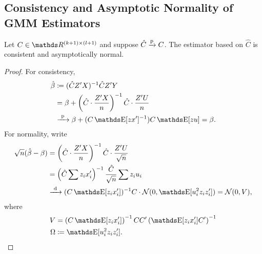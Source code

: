 \documentclass[letterpaper, 10pt]{article}
\begin{document}
\subsection{Consistency and Asymptotic Normality of GMM Estimators}
\begin{proposition}
  Let \(C \in \RR^{(k + 1) \times (l + 1)}\) and suppose \(\hat{C} \xrightarrow{\mathrm{p}} C\).
  The estimator based on \(\hat{C}\) is consistent and asymptotically normal.
\end{proposition}
\begin{proof}
  For consistency,
  \begin{align*}
    \hat{\beta}
    &\coloneqq (\hat{C} Z' X)^{-1} \hat{C} Z' Y \\
    &= \beta + \left( \hat{C} \cdot \frac{Z' X}{n} \right)^{-1} \hat{C} \cdot \frac{Z' U}{n} \\
    &\longprobto \beta + (C\E[zx']^{-1}) C \E[zu] = \beta.
  \end{align*}
  For normality, write
  \begin{align*}
    \sqrt{n} (\hat{\beta} - \beta)
    &= \left( \hat{C} \cdot \frac{Z' X}{n} \right)^{-1} \hat{C} \cdot \frac{Z' U}{\sqrt{n}} \\
    &= \left( \hat{C} \sum z_i x_i' \right)^{-1} \frac{\hat{C}}{\sqrt{n}} \sum z_i u_i \\
    &\longdistto (C \E[z_i x_i'])^{-1} C \cdot \Normal(0, \E[u_i^2 z_i z_i'])
    = \Normal(0, V),
  \end{align*}
  where
  \begin{align*}
    V
    &= \left( C \E[z_i x_i'] \right)^{-1} C C' \left( \E[z_i x_i'] C' \right)^{-1} \\
    \Omega
    &\coloneqq \E[u_i^2 z_i z_i'].
  \end{align*}
\end{proof}
\end{document}
